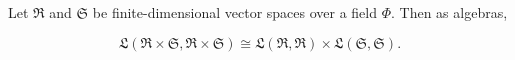 Let $\mathfrak{R}$ and $\mathfrak{S}$ be finite-dimensional vector spaces over a field $\Phi$. Then as algebras,

$$\mathfrak{L}(\mathfrak{R} \times \mathfrak{S}, \mathfrak{R} \times \mathfrak{S}) \cong \mathfrak{L}(\mathfrak{R}, \mathfrak{R}) \times \mathfrak{L}(\mathfrak{S}, \mathfrak{S}).$$
